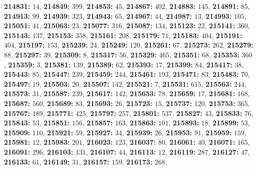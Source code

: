 \textsf{\bfseries 214831:} $14$, \textsf{\bfseries 214849:} $399$, \textsf{\bfseries 214853:} $45$, \textsf{\bfseries 214867:} $402$, \textsf{\bfseries 214883:} $145$, \textsf{\bfseries 214891:} $85$, \textsf{\bfseries 214913:} $99$, \textsf{\bfseries 214939:} $323$, \textsf{\bfseries 214943:} $65$, \textsf{\bfseries 214967:} $44$, \textsf{\bfseries 214987:} $13$, \textsf{\bfseries 214993:} $105$, \textsf{\bfseries 215051:} $41$, \textsf{\bfseries 215063:} $23$, \textsf{\bfseries 215077:} $316$, \textsf{\bfseries 215087:} $134$, \textsf{\bfseries 215123:} $22$, \textsf{\bfseries 215141:} $360$, \textsf{\bfseries 215143:} $137$, \textsf{\bfseries 215153:} $358$, \textsf{\bfseries 215161:} $208$, \textsf{\bfseries 215179:} $71$, \textsf{\bfseries 215183:} $404$, \textsf{\bfseries 215191:} $404$, \textsf{\bfseries 215197:} $153$, \textsf{\bfseries 215239:} $24$, \textsf{\bfseries 215249:} $120$, \textsf{\bfseries 215261:} $67$, \textsf{\bfseries 215273:} $262$, \textsf{\bfseries 215279:} $88$, \textsf{\bfseries 215297:} $39$, \textsf{\bfseries 215309:} $8$, \textsf{\bfseries 215317:} $56$, \textsf{\bfseries 215329:} $465$, \textsf{\bfseries 215351:} $68$, \textsf{\bfseries 215353:} $360$, \textsf{\bfseries 215359:} $3$, \textsf{\bfseries 215381:} $139$, \textsf{\bfseries 215389:} $62$, \textsf{\bfseries 215393:} $17$, \textsf{\bfseries 215399:} $84$, \textsf{\bfseries 215417:} $38$, \textsf{\bfseries 215443:} $85$, \textsf{\bfseries 215447:} $239$, \textsf{\bfseries 215459:} $244$, \textsf{\bfseries 215461:} $193$, \textsf{\bfseries 215471:} $83$, \textsf{\bfseries 215483:} $70$, \textsf{\bfseries 215497:} $19$, \textsf{\bfseries 215503:} $20$, \textsf{\bfseries 215507:} $142$, \textsf{\bfseries 215521:} $7$, \textsf{\bfseries 215531:} $615$, \textsf{\bfseries 215563:} $244$, \textsf{\bfseries 215573:} $31$, \textsf{\bfseries 215587:} $239$, \textsf{\bfseries 215617:} $142$, \textsf{\bfseries 215653:} $78$, \textsf{\bfseries 215659:} $17$, \textsf{\bfseries 215681:} $168$, \textsf{\bfseries 215687:} $560$, \textsf{\bfseries 215689:} $83$, \textsf{\bfseries 215693:} $26$, \textsf{\bfseries 215723:} $15$, \textsf{\bfseries 215737:} $120$, \textsf{\bfseries 215753:} $365$, \textsf{\bfseries 215767:} $189$, \textsf{\bfseries 215771:} $425$, \textsf{\bfseries 215797:} $257$, \textsf{\bfseries 215801:} $537$, \textsf{\bfseries 215827:} $43$, \textsf{\bfseries 215833:} $76$, \textsf{\bfseries 215843:} $53$, \textsf{\bfseries 215851:} $156$, \textsf{\bfseries 215857:} $163$, \textsf{\bfseries 215863:} $101$, \textsf{\bfseries 215893:} $18$, \textsf{\bfseries 215899:} $53$, \textsf{\bfseries 215909:} $110$, \textsf{\bfseries 215921:} $59$, \textsf{\bfseries 215927:} $34$, \textsf{\bfseries 215939:} $26$, \textsf{\bfseries 215953:} $91$, \textsf{\bfseries 215959:} $159$, \textsf{\bfseries 215981:} $12$, \textsf{\bfseries 215983:} $201$, \textsf{\bfseries 216023:} $123$, \textsf{\bfseries 216037:} $80$, \textsf{\bfseries 216061:} $40$, \textsf{\bfseries 216071:} $165$, \textsf{\bfseries 216091:} $296$, \textsf{\bfseries 216103:} $131$, \textsf{\bfseries 216107:} $44$, \textsf{\bfseries 216113:} $12$, \textsf{\bfseries 216119:} $287$, \textsf{\bfseries 216127:} $47$, \textsf{\bfseries 216133:} $61$, \textsf{\bfseries 216149:} $31$, \textsf{\bfseries 216157:} $159$, \textsf{\bfseries 216173:} $268$, 

